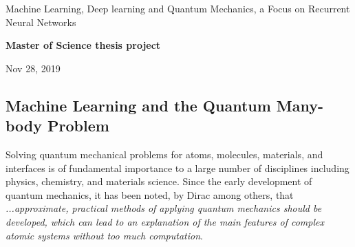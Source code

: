 \documentclass[%
oneside,                 %
final,                   %
10pt]{article}
\begin{document}

\newcommand{\exercisesection}[1]{\subsection*{#1}}






\thispagestyle{empty}

\begin{center}
{\LARGE\bf
\begin{spacing}{1.25}
Machine Learning, Deep learning and Quantum Mechanics, a Focus on Recurrent Neural Networks
\end{spacing}
}
\end{center}


\begin{center}
{\bf Master of Science thesis project${}^{}$} \\ [0mm]
\end{center}

\begin{center}
\end{center}
    

\begin{center}
Nov 28, 2019
\end{center}

\vspace{1cm}


\subsection*{Machine Learning and the Quantum Many-body Problem}

Solving quantum mechanical problems for atoms,  molecules, materials, and
interfaces is of fundamental importance to a large number of
disciplines including physics, chemistry, and materials science. Since
the early development of quantum mechanics, it has been noted, by
Dirac among others, that \emph{...approximate, practical methods of applying quantum mechanics should be developed, which can lead to an explanation of the main features of complex atomic systems without too much computation}. 
\end{document}
